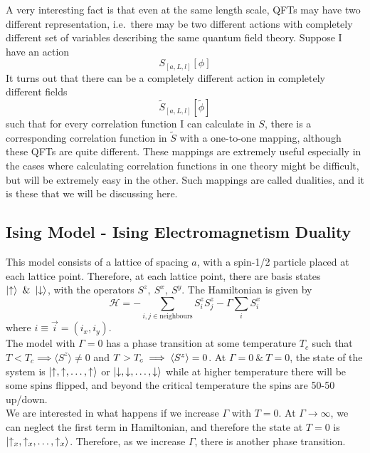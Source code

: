 \documentclass[11pt]{article}
\newcommand{\hd}{\mathcal{H}}
\numberwithin{equation}{section}
\begin{document}
A very interesting fact is that even at the same length scale, QFTs may have two different representation, i.e.\ there may be two different actions with completely different set of variables describing the same quantum field theory. Suppose I have an action 
\begin{equation*}
    S_{[a, L,l]}[\phi]
\end{equation*}
It turns out that there can be a completely different action in completely different fields 
\begin{equation*}
    \tilde{S}_{[a,L,l]}[\tilde\phi]
\end{equation*}
such that for every correlation function I can calculate in \(S\), there is a corresponding correlation function in \(\tilde S\) with a one-to-one mapping, although these QFTs are quite different. These mappings are extremely useful especially in the cases where calculating correlation functions in one theory might be difficult, but will be extremely easy in the other. Such mappings are called dualities, and it is these that we will be discussing here.

\subsection{Ising Model - Ising Electromagnetism Duality}
This model consists of a lattice of spacing \(a\), with a spin-1/2 particle placed at each lattice point. Therefore, at each lattice point, there are basis states \(\ket{\uparrow} ~\&~\ket{\downarrow}\), with the operators \(S^z,~S^x,~S^y\). The Hamiltonian is given by 
\begin{equation*}
    \hd = -\sum_{i,j\in \text{neighbours}} S_i^z S_j^z - \Gamma\sum_i S_i^x
\end{equation*}
where \(i\equiv\vec{i} = (i_x, i_y)\).\\
The model with \(\Gamma = 0 \) has a phase transition at some temperature \(T_c\) such that \(T<T_c\implies \langle S^z \rangle \ne 0\) and \(T>T_c \implies \braket{S^z} = 0\). At  \(\Gamma = 0 ~\&~ T=0\), the state of the system is \(\ket{\uparrow, \uparrow,\ldots,\uparrow}\) or \(\ket{\downarrow,\downarrow,\ldots,\downarrow}\) while at higher temperature there will be some spins flipped, and beyond the critical temperature the spins are 50-50 up/down.\\
We are interested in what happens if we increase \(\Gamma\) with \(T=0\). At \(\Gamma\to \infty\), we can neglect the first term in Hamiltonian, and therefore the state at \(T=0\) is \(\ket{\uparrow_x,\uparrow_x,\ldots,\uparrow_x}\). Therefore, as we increase \(\Gamma\), there is another phase transition. \\
\end{document}
